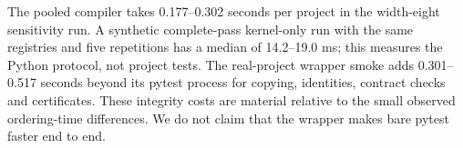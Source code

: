 The pooled compiler takes 0.177--0.302 seconds per project in the width-eight sensitivity run. A synthetic complete-pass kernel-only run with the same registries and five repetitions has a median of 14.2--19.0 ms; this measures the Python protocol, not project tests. The real-project wrapper smoke adds 0.301--0.517 seconds beyond its pytest process for copying, identities, contract checks and certificates. These integrity costs are material relative to the small observed ordering-time differences. We do not claim that the wrapper makes bare pytest faster end to end.
